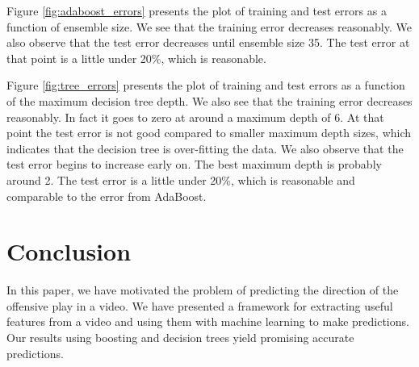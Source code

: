 \documentclass{article} %
\begin{document}
Figure \ref{fig:adaboost_errors} presents the plot of training and test errors as a function of ensemble size. We see that the training error decreases reasonably. We also observe that the test error decreases until ensemble size 35. The test error at that point is a little under 20\%, which is reasonable.

Figure \ref{fig:tree_errors} presents the plot of training and test errors as a function of the maximum decision tree depth. We also see that the training error decreases reasonably. In fact it goes to zero at around a maximum depth of 6. At that point the test error is not good compared to smaller maximum depth sizes, which indicates that the decision tree is over-fitting the data. We also observe that the test error begins to increase early on. The best maximum depth is probably around 2. The test error is a little under 20\%, which is reasonable and comparable to the error from AdaBoost.

\section{Conclusion}

In this paper, we have motivated the problem of predicting the direction of the offensive play in a video. We have presented a framework for extracting useful features from a video and using them with machine learning to make predictions. Our results using boosting and decision trees yield promising accurate predictions.
\end{document}
